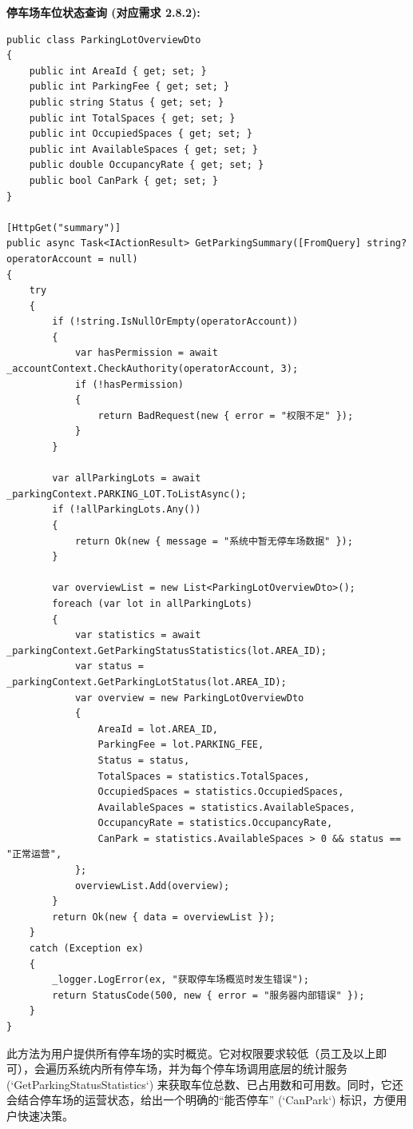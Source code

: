 \documentclass[]{article}
\begin{document}
\textbf{停车场车位状态查询 (对应需求 2.8.2):}
\begin{verbatim}
public class ParkingLotOverviewDto
{
    public int AreaId { get; set; }
    public int ParkingFee { get; set; }
    public string Status { get; set; }
    public int TotalSpaces { get; set; }
    public int OccupiedSpaces { get; set; }
    public int AvailableSpaces { get; set; }
    public double OccupancyRate { get; set; }
    public bool CanPark { get; set; }
}

[HttpGet("summary")]
public async Task<IActionResult> GetParkingSummary([FromQuery] string? operatorAccount = null)
{
    try
    {
        if (!string.IsNullOrEmpty(operatorAccount))
        {
            var hasPermission = await _accountContext.CheckAuthority(operatorAccount, 3);
            if (!hasPermission)
            {
                return BadRequest(new { error = "权限不足" });
            }
        }

        var allParkingLots = await _parkingContext.PARKING_LOT.ToListAsync();
        if (!allParkingLots.Any())
        {
            return Ok(new { message = "系统中暂无停车场数据" });
        }

        var overviewList = new List<ParkingLotOverviewDto>();
        foreach (var lot in allParkingLots)
        {
            var statistics = await _parkingContext.GetParkingStatusStatistics(lot.AREA_ID);
            var status = _parkingContext.GetParkingLotStatus(lot.AREA_ID);
            var overview = new ParkingLotOverviewDto
            {
                AreaId = lot.AREA_ID,
                ParkingFee = lot.PARKING_FEE,
                Status = status,
                TotalSpaces = statistics.TotalSpaces,
                OccupiedSpaces = statistics.OccupiedSpaces,
                AvailableSpaces = statistics.AvailableSpaces,
                OccupancyRate = statistics.OccupancyRate,
                CanPark = statistics.AvailableSpaces > 0 && status == "正常运营",
            };
            overviewList.Add(overview);
        }
        return Ok(new { data = overviewList });
    }
    catch (Exception ex)
    {
        _logger.LogError(ex, "获取停车场概览时发生错误");
        return StatusCode(500, new { error = "服务器内部错误" });
    }
}
\end{verbatim}
此方法为用户提供所有停车场的实时概览。它对权限要求较低（员工及以上即可），会遍历系统内所有停车场，并为每个停车场调用底层的统计服务 (`GetParkingStatusStatistics`) 来获取车位总数、已占用数和可用数。同时，它还会结合停车场的运营状态，给出一个明确的“能否停车” (`CanPark`) 标识，方便用户快速决策。
\end{document}
